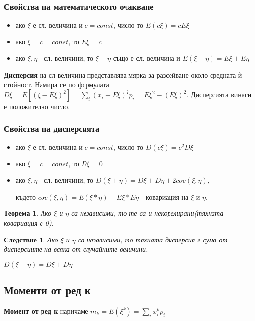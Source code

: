 \documentclass[fleqn,12pt]{article}
\newtheorem*{Th}{Теорема}
\newtheorem*{Corollary}{Следствие}
\begin{document}
\begin{justify}
\subsubsection{Свойства на математическото очакване}
\begin{itemize}
    \item ако $\xi$ е сл. величина  и $c=const$, число то $E(c\xi) = cE\xi$
    \item ако $\xi = c = const$, то $E\xi = c$
    \item ако $\xi, \eta$ - сл. величини, то $\xi + \eta$ също е сл. величина и $E\left( \xi + \eta \right) = E\xi +
    E\eta$
\end{itemize}

\textbf{Дисперсия} на сл величина представлява мярка за разсейване около средната ѝ стойност. Намира се по формулата
$D\xi = E[\left(\xi - E\xi\right)^2] = \sum_i (x_i - E\xi)^2 p_i = E\xi^2 - (E\xi)^2$.
Дисперсията винаги е положително число.

\subsubsection{Свойства на дисперсията}
\begin{itemize}
    \item ако $\xi$ е сл. величина  и $c=const$, число то $D\left( c\xi \right) = c^2 D\xi$
    \item ако $\xi = c = const$, то $D\xi = 0$
    \item ако $\xi, \eta$ - сл. величини, то  $D(\xi + \eta) = D\xi + D\eta + 2cov(\xi, \eta)$, 

    където $cov(\xi, \eta) = E\left( \xi*\eta \right) - E\xi * E\eta$ - ковариация на $\xi$ и $\eta$.
\end{itemize}

\begin{Th}
    Ако $\xi$ и $\eta$ са независими, то те са и некорелирани(тяхната ковариация е 0).
\end{Th}
\begin{Corollary}
    Ако $\xi$ и $\eta$ са независими, то тяхната дисперсия е сума от дисперсиите на всяка от случайните величини.

    $D(\xi + \eta) = D\xi + D\eta$
\end{Corollary}

\subsection{Моменти от ред к}
\textbf{Момент от ред к} наричаме $m_k = E(\xi^k) = \sum_i x_i^kp_i$


\end{justify}
\end{document}
